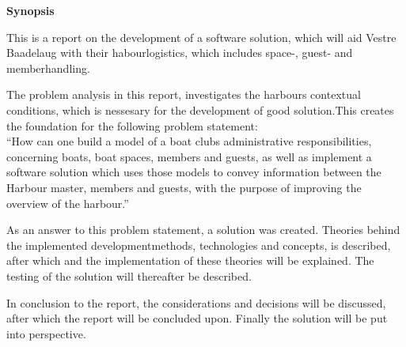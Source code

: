 \begin{center}\textbf{Synopsis}\\ \end{center}

This is a report on the development of a software solution, which will aid Vestre Baadelaug with their habourlogistics, which includes space-, guest- and memberhandling.

The problem analysis in this report, investigates the harbours contextual conditions, which is nessesary for the development of good solution.This creates the foundation for the following problem statement:\\

\enquote{How can one build a model of a boat clubs administrative responsibilities, concerning boats, boat spaces, members and guests, as well as implement a software solution which uses those models to convey information between the Harbour master, members and guests, with the purpose of improving the overview of the harbour.}

As an answer to this problem statement, a solution was created. Theories behind the implemented developmentmethods, technologies and concepts, is described, after which and the implementation of these theories will be explained. The testing of the solution will thereafter be described.

In conclusion to the report, the considerations and decisions will be discussed, after which the report will be concluded upon. Finally the solution will be put into perspective.